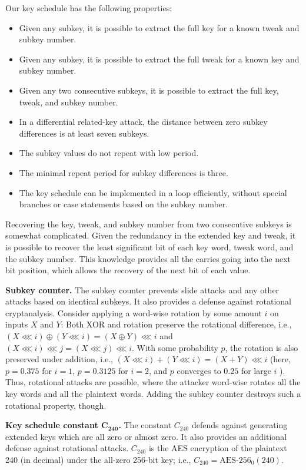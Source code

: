 \documentclass[11pt,twoside]{article}
\newcommand{\xor}{\oplus}
\newcommand{\TheConst}{C_{240}} %
\newcommand{\rol}{\mathbin{\lll}}
\begin{document}
Our key schedule has the following properties:
%
\begin{itemize}
\item Given any subkey, it is possible to extract the full key for a known tweak and subkey number.
\item Given any subkey, it is possible to extract the full tweak for a known key and subkey number.
\item Given any two consecutive subkeys, it is possible to extract the full key, tweak, and subkey number.
\item In a differential related-key attack, the distance between zero subkey differences is at least seven subkeys.
\item The subkey values do not repeat with low period.
\item The minimal repeat period for subkey differences is three.
\item The key schedule can be implemented in a loop efficiently, without special branches or case statements based on the subkey number.
\end{itemize}

Recovering the key, tweak, and subkey number from two consecutive subkeys is somewhat complicated. Given the redundancy in the extended key and tweak, it is possible to recover the least significant bit of each key word, tweak word, and the subkey number. This knowledge provides all the carries going into the next bit position, which allows the recovery of the next bit of each value.

{\bf Subkey counter.} The subkey counter prevents slide attacks \cite{BW99,
  BW00} and any other attacks based on identical subkeys. It also provides
a defense against rotational cryptanalysis. Consider applying a word-wise
rotation by some amount $i$ on inputs $X$ and $Y$: Both XOR and
rotation preserve the rotational difference, i.e., $(X \rol i) \xor (Y \rol i)
= (X \xor Y) \rol i$ and $(X \rol i) \rol j = (X \rol j) \rol i$. With some 
probability $p$, the rotation is also preserved under addition, i.e., 
$(X \rol i) + (Y \rol i) = (X + Y) \rol i$ (here, $p=0.375$ for $i=1$, 
$p=0.3125$ for $i=2$, and $p$ converges to $0.25$ for large $i$
\cite{DaumThesis}). Thus, rotational attacks are possible, where the attacker
word-wise rotates all the key words and all the plaintext words. Adding the
subkey counter destroys such a rotational property, though. 

{\bf Key schedule constant $\mathbf{\TheConst}$.} The constant
$\TheConst$ defends against generating extended keys which are all
zero or almost zero. It also provides an additional defense against
rotational attacks. $\TheConst$ is the AES encryption of the plaintext
240 (in decimal) under the all-zero 256-bit key; i.e.,
$\TheConst=\text{AES-256}_0(240)$. 
\end{document}
